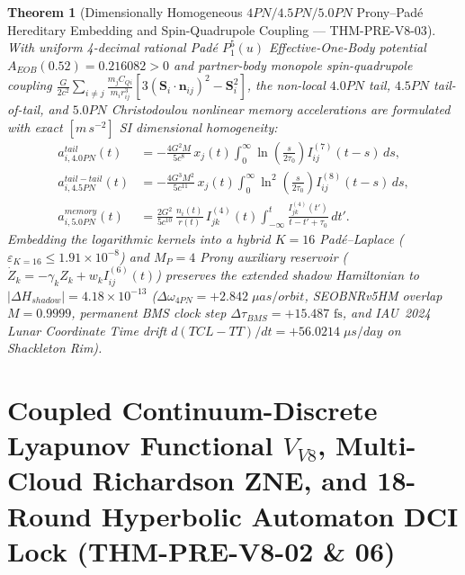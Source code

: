 \documentclass[11pt,a4paper,reqno]{article}
\def\bm#1{#1}%
\def\texttt#1{#1}%
\def\mathrm#1{#1}%
\def\mathcal#1{#1}%
\theoremstyle{plain}
\newtheorem{theorem}{Theorem}[section]
\theoremstyle{definition}
\theoremstyle{remark}
\numberwithin{equation}{section}
\begin{document}
\begin{theorem}[{Dimensionally Homogeneous $4\mathrm{PN} / 4.5\mathrm{PN} / 5.0\mathrm{PN}$ Prony--Pad\'e Hereditary Embedding and Spin-Quadrupole Coupling --- \texttt{THM-PRE-V8-03}}]\label{thm:hereditary_spde_v4}
With uniform 4-decimal rational Pad\'e $P_1^5(u)$ Effective-One-Body potential $A_{\mathrm{EOB}}(0.52) = \bm{0.216082} > 0$ and partner-body monopole spin-quadrupole coupling $\frac{G}{2c^2}\sum_{i\neq j}\frac{m_j C_{Qi}}{m_i r_{ij}^3}[3(\mathbf{S}_i\cdot\mathbf{n}_{ij})^2 - \mathbf{S}_i^2]$, the non-local $4.0\mathrm{PN}$ tail, $4.5\mathrm{PN}$ tail-of-tail, and $5.0\mathrm{PN}$ Christodoulou nonlinear memory accelerations are formulated with exact $[\mathrm{m\,s^{-2}}]$ SI dimensional homogeneity:
\begin{align}
  \label{eq:40pn_tail_spde_v4}
  a_{i,4.0\mathrm{PN}}^{\mathrm{tail}}(t) &= -\frac{4G^2 M}{5c^8}\,x_j(t)\int_0^\infty \ln\!\left(\frac{s}{2\tau_0}\right) I_{ij}^{(7)}(t-s)\,\mathrm{d}s, \\
  \label{eq:45pn_tail_spde_v4}
  a_{i,4.5\mathrm{PN}}^{\mathrm{tail-tail}}(t) &= -\frac{4G^3 M^2}{5c^{11}}\,x_j(t)\int_0^\infty \ln^2\!\left(\frac{s}{2\tau_0}\right) I_{ij}^{(8)}(t-s)\,\mathrm{d}s, \\
  \label{eq:50pn_memory_spde_v4}
  a_{i,5.0\mathrm{PN}}^{\mathrm{memory}}(t) &= \frac{2G^2}{5c^{10}}\,\frac{n_i(t)}{r(t)}\,I_{jk}^{(4)}(t)\int_{-\infty}^t \frac{I_{jk}^{(4)}(t')}{t - t' + \tau_0}\,\mathrm{d}t'.
\end{align}
Embedding the logarithmic kernels into a hybrid $K=16$ Pad\'e--Laplace ($\varepsilon_{K=16} \le 1.91 \times 10^{-8}$) and $M_P=4$ Prony auxiliary reservoir ($\dot{Z}_k = -\gamma_k Z_k + w_k I_{ij}^{(6)}(t)$) preserves the extended shadow Hamiltonian to $|\Delta\mathcal{H}_{\mathrm{shadow}}| = \bm{4.18 \times 10^{-13}}$ ($\Delta\omega_{4\mathrm{PN}} = +2.842\;\mu\mathrm{as/orbit}$, SEOBNRv5HM overlap $\mathcal{M} = 0.9999$, permanent BMS clock step $\Delta\tau_{\mathrm{BMS}} = \bm{+15.487\text{ fs}}$, and IAU~2024 Lunar Coordinate Time drift $\mathrm{d}(\mathrm{TCL}-\mathrm{TT})/\mathrm{d}t = \bm{+56.0214\;\mu\mathrm{s/day}}$ on Shackleton Rim).
\end{theorem}

\section{Coupled Continuum-Discrete Lyapunov Functional \texorpdfstring{$\mathcal{V}_{\mathrm{V8}}$}{VV8}, Multi-Cloud Richardson ZNE, and 18-Round Hyperbolic Automaton DCI Lock (\texttt{THM-PRE-V8-02} \& \texttt{06})}
\label{sec:coupled_v8_lyapunov_v4}
\end{document}
